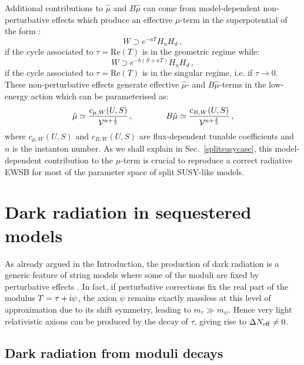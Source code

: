\documentclass[11pt,a4paper]{article}
\newcommand{\be}{\begin{equation}}
\newcommand{\ee}{\end{equation}}
\newcommand{\V}{{\cal{V}}}
\begin{document}
Additional contributions to $\hat{\mu}$ and $B\hat{\mu}$ can come from model-dependent non-perturbative effects which produce an effective $\mu$-term in the superpotential of the form \cite{SoftTermsSeqLVS}:
\be
W \supset e^{-a T} H_u H_d\,,
\ee
if the cycle associated to $\tau = \text{Re}(T)$ is in the geometric regime while:
\be
W \supset e^{-b(S + \kappa T)} H_u H_d\,,
\ee
if the cycle associated to $\tau = \text{Re}(T)$ is in the singular regime, i.e. if $\tau \rightarrow 0$. These non-perturbative effects generate effective $\hat{\mu}$- and $B\hat{\mu}$-terms in the low-energy action which can be parameterised as:
\be
\label{mubmu}
\hat{\mu} \simeq \frac{c_{\mu,W}(U,S)}{\V^{n + \frac{1}{3}}}\,, \qquad\qquad B\hat{\mu} \simeq \frac{c_{B,W}(U,S)}{\V^{n + \frac{4}{3}}}\,,
\ee
where $c_{\mu,W}(U,S)$ and $c_{B,W}(U,S)$ are flux-dependent tunable coefficients and $n$ is the instanton number. As we shall explain in Sec.~\ref{splitsusycase}, this model-dependent contribution to the $\mu$-term is crucial to reproduce a correct radiative EWSB for most of the parameter space of split SUSY-like models.

\section{Dark radiation in sequestered models}
\label{drs}

As already argued in the Introduction, the production of dark radiation is a generic feature of string models where some of the moduli are fixed by perturbative effects \cite{DMDRcorr}. In fact, if perturbative corrections fix the real part of the modulus $T=\tau + {\rm i}\psi$, the axion $\psi$ remains exactly massless at this level of approximation due to its shift symmetry, leading to $m_\tau \gg m_\psi$. Hence very light relativistic axions can be produced by the decay of $\tau$, giving rise to $\Delta N_{\rm eff} \neq 0$. 

\subsection{Dark radiation from moduli decays}
\end{document}
